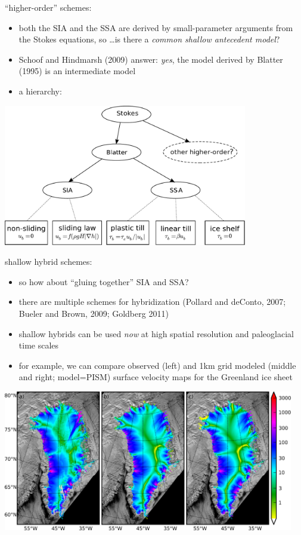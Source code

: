 \documentclass[titlepage,letterpaper,final,11pt]{scrartcl}
\begin{document}
``higher-order'' schemes:

\begin{itemize}
\item both the SIA and the SSA are derived by small-parameter arguments from the Stokes equations, so \dots is there a \emph{common shallow antecedent model}?
\item Schoof and Hindmarsh (2009)\nocite{SchoofHindmarsh} answer:  \emph{yes}, the model derived by Blatter (1995)\nocite{Blatter} is an intermediate model
\item a hierarchy:
\end{itemize}

\begin{center}
\includegraphics[width=0.8\textwidth]{hierarchy}
\end{center}

shallow hybrid schemes:

\begin{itemize}
\item so how about ``gluing together'' SIA and SSA?
\item there are multiple schemes for hybridization (Pollard and deConto, 2007\nocite{PollardDeConto}; Bueler and Brown, 2009\nocite{BBssasliding}; Goldberg 2011\nocite{Goldberg2011})
\item shallow hybrids can be used \emph{now} at high spatial resolution and paleoglacial time scales
\item for example, we can compare observed (left) and 1km grid modeled (middle and right; model=PISM) surface velocity maps for the Greenland ice sheet
\end{itemize}

\begin{center}
\includegraphics[width=5.0in]{csurf_insar_pism_1km}
\end{center}


\clearpage\newpage


\end{document}
